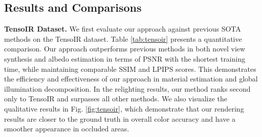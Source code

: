 \documentclass{article} %
\begin{document}
\subsection{Results and Comparisons}
\textbf{TensoIR Dataset.} We first evaluate our approach against previous SOTA methods on the TensoIR dataset. Table \ref{tab:tensoir} presents a quantitative comparison. Our approach outperforms previous methods in both novel view synthesis and albedo estimation in terms of PSNR with the shortest training time, while maintaining comparable SSIM and LPIPS scores. This demonstrates the efficiency and effectiveness of our approach in material estimation and global illumination decomposition. In the relighting results, our method ranks second only to TensoIR and surpasses all other methods. We also visualize the qualitative results in Fig. \ref{fig:tensoir}, which demonstrate that our rendering results are closer to the ground truth in overall color accuracy and have a smoother appearance in occluded areas. 
\end{document}
